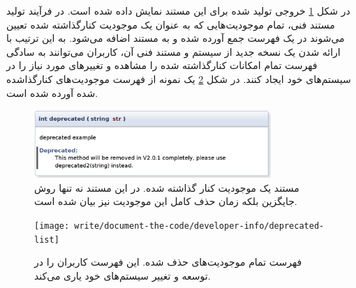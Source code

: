 در شکل \ref{write/document-the-code/developer-info/deprecated} خروجی تولید شده
برای این مستند نمایش داده شده است.
در فرآیند تولید مستند فنی، تمام موجودیت‌هایی که به عنوان یک موجودیت کنارگذاشته
شده تعیین می‌شوند در یک فهرست جمع آورده شده و به مستند اضافه می‌شود.
به این ترتیب با ارائه شدن یک نسخه جدید از سیستم و مستند فنی آن، کاربران
می‌توانند به سادگی فهرست تمام امکانات کنارگذاشته شده را مشاهده و تغییرهای مورد
نیاز را در سیستم‌های خود ایجاد کنند.
در شکل \ref{write/document-the-code/developer-info/deprecated-list} یک نمونه از
فهرست موجودیت‌های کنارگذاشده شده آورده شده است.
\begin{figure}
	\centering
	\includegraphics[width=0.8\textwidth]{image/write/document-the-code/developer-info/deprecated}
	\caption[موجودیت کنار گذاشته شده]{
		مستند یک موجودیت کنار گذاشته شده. در این مستند نه تنها روش جایگزین بلکه زمان
		حذف کامل این موجودیت نیز بیان شده است.
	}
	\label{write/document-the-code/developer-info/deprecated}
\end{figure}
\begin{figure}
	\centering
	\texttt{[image: write/document-the-code/developer-info/deprecated-list]}
	\caption[فهرست موجودیت‌های کنار گذاشته شده]{
		فهرست تمام موجودیت‌های حذف شده. این فهرست کاربران را در توسعه و تغییر سیستم‌های خود
		یاری می‌کند.
	}
	\label{write/document-the-code/developer-info/deprecated-list}
\end{figure}


% 


